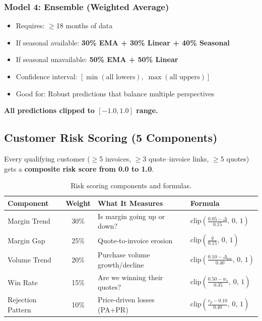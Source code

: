 \documentclass[11pt,a4paper]{article}
\begin{document}
\subsubsection{Model 4: Ensemble (Weighted Average)}
\begin{itemize}[nosep]
  \item Requires: $\geq$18 months of data
  \item If seasonal available: \textbf{30\% EMA + 30\% Linear + 40\% Seasonal}
  \item If seasonal unavailable: \textbf{50\% EMA + 50\% Linear}
  \item Confidence interval: $[\min(\text{all lowers}),\; \max(\text{all uppers})]$
  \item Good for: Robust predictions that balance multiple perspectives
\end{itemize}

\textbf{All predictions clipped to $[-1.0, 1.0]$ range.}

\subsection{Customer Risk Scoring (5 Components)}

Every qualifying customer ($\geq$5 invoices, $\geq$3 quote--invoice links, $\geq$5 quotes) gets a \textbf{composite risk score from 0.0 to 1.0}.

\begin{table}[H]
\centering
\small
\begin{tabularx}{\textwidth}{l c X l}
\toprule
\textbf{Component} & \textbf{Weight} & \textbf{What It Measures} & \textbf{Formula} \\
\midrule
Margin Trend & 30\% & Is margin going up or down? & $\text{clip}\!\left(\frac{0.05 - \Delta}{0.15},\, 0,\, 1\right)$ \\[4pt]
Margin Gap & 25\% & Quote-to-invoice erosion & $\text{clip}\!\left(\frac{\bar{g}}{0.15},\, 0,\, 1\right)$ \\[4pt]
Volume Trend & 20\% & Purchase volume growth/decline & $\text{clip}\!\left(\frac{0.10 - \Delta_{\text{rev}}}{0.40},\, 0,\, 1\right)$ \\[4pt]
Win Rate & 15\% & Are we winning their quotes? & $\text{clip}\!\left(\frac{0.50 - w_r}{0.35},\, 0,\, 1\right)$ \\[4pt]
Rejection Pattern & 10\% & Price-driven losses (PA+PR) & $\text{clip}\!\left(\frac{r_p - 0.10}{0.40},\, 0,\, 1\right)$ \\
\bottomrule
\end{tabularx}
\caption{Risk scoring components and formulas.}
\end{table}
\end{document}
